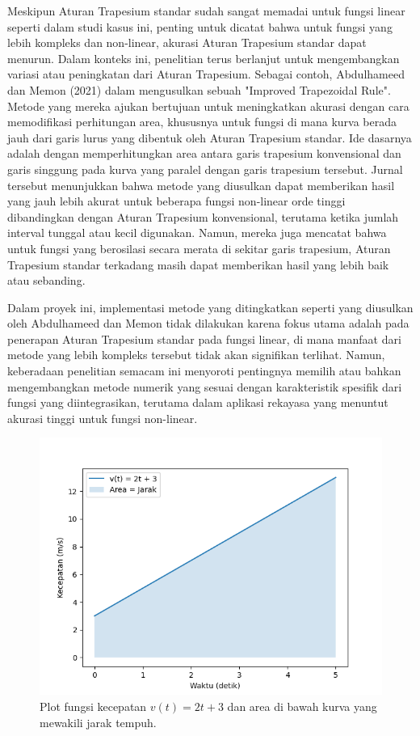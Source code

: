 \documentclass[conference]{IEEEtran}
\begin{document}
Meskipun Aturan Trapesium standar sudah sangat memadai untuk fungsi linear seperti dalam studi kasus ini, penting untuk dicatat bahwa untuk fungsi yang lebih kompleks dan non-linear, akurasi Aturan Trapesium standar dapat menurun. Dalam konteks ini, penelitian terus berlanjut untuk mengembangkan variasi atau peningkatan dari Aturan Trapesium. Sebagai contoh, Abdulhameed dan Memon (2021) dalam \cite{b_abdulhameed} mengusulkan sebuah "Improved Trapezoidal Rule". Metode yang mereka ajukan bertujuan untuk meningkatkan akurasi dengan cara memodifikasi perhitungan area, khususnya untuk fungsi di mana kurva berada jauh dari garis lurus yang dibentuk oleh Aturan Trapesium standar. Ide dasarnya adalah dengan memperhitungkan area antara garis trapesium konvensional dan garis singgung pada kurva yang paralel dengan garis trapesium tersebut. Jurnal tersebut menunjukkan bahwa metode yang diusulkan dapat memberikan hasil yang jauh lebih akurat untuk beberapa fungsi non-linear orde tinggi dibandingkan dengan Aturan Trapesium konvensional, terutama ketika jumlah interval tunggal atau kecil digunakan. Namun, mereka juga mencatat bahwa untuk fungsi yang berosilasi secara merata di sekitar garis trapesium, Aturan Trapesium standar terkadang masih dapat memberikan hasil yang lebih baik atau sebanding.

Dalam proyek ini, implementasi metode yang ditingkatkan seperti yang diusulkan oleh Abdulhameed dan Memon \cite{b_abdulhameed} tidak dilakukan karena fokus utama adalah pada penerapan Aturan Trapesium standar pada fungsi linear, di mana manfaat dari metode yang lebih kompleks tersebut tidak akan signifikan terlihat. Namun, keberadaan penelitian semacam ini menyoroti pentingnya memilih atau bahkan mengembangkan metode numerik yang sesuai dengan karakteristik spesifik dari fungsi yang diintegrasikan, terutama dalam aplikasi rekayasa yang menuntut akurasi tinggi untuk fungsi non-linear.

\begin{figure}[htbp]
\centerline{\includegraphics[width=1.0\linewidth]{images/velocity_plot.png}} %
\caption{Plot fungsi kecepatan \( v(t) = 2t + 3 \) dan area di bawah kurva yang mewakili jarak tempuh.}
\label{fig:velocity}
\end{figure}
\end{document}
